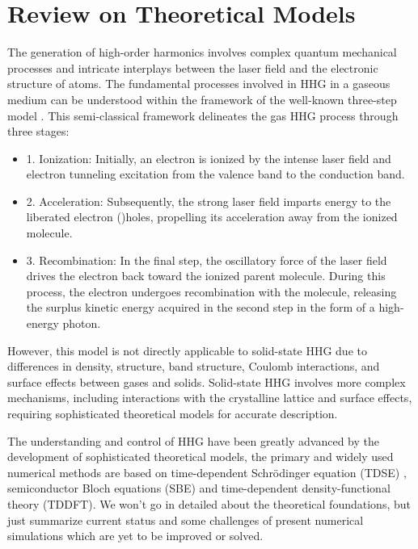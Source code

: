 \section{Review on Theoretical Models}
The generation of high-order harmonics involves complex quantum mechanical processes and intricate
interplays between the laser field and the electronic structure of atoms. The fundamental processes involved in HHG in a gaseous medium can
be understood within the framework of the well-known three-step model  \cite{corkum1993plasma,
	lewenstein1994theory}. This semi-classical framework delineates the gas HHG process through three stages:
\begin{itemize}
	\item 1. Ionization: Initially, an electron is ionized by the intense laser field and electron tunneling excitation from the valence band to the conduction band.

	\item 2. Acceleration: Subsequently, the strong laser field imparts energy to the liberated electron ()holes, propelling its acceleration away from the ionized molecule.

	\item 3. Recombination: In the final step, the oscillatory force of the laser field drives the electron back toward the ionized parent molecule. During this process, the electron undergoes recombination with the molecule, releasing the surplus kinetic energy acquired in the second step in the form of a high-energy photon.\\
\end{itemize}

However, this model is not directly applicable to solid-state HHG due to differences in density, structure, band structure, Coulomb interactions, and surface effects between gases and solids. Solid-state HHG involves more complex mechanisms, including interactions with the crystalline lattice and surface effects, requiring sophisticated theoretical models for accurate description.

The understanding and control of HHG have been greatly advanced by the development of sophisticated
theoretical models, the primary and widely used numerical methods are based on time-dependent
Schrödinger equation (\gls{TDSE}) , semiconductor Bloch equations (\gls{SBE})
and time-dependent density-functional theory (\gls{TDDFT}).
We won't go in detailed about the theoretical foundations, but just summarize current status and some challenges of present numerical simulations which are yet to be improved or solved.

